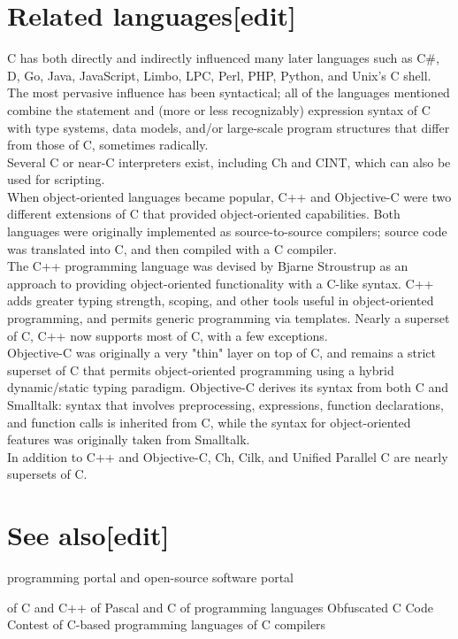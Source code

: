 \documentclass{article}\usepackage{titlesec}
\begin{document}
\section{Related languages[edit]}
C has both directly and indirectly influenced many later languages such as C\#, D, Go, Java, JavaScript, Limbo, LPC, Perl, PHP, Python, and Unix's C shell. The most pervasive influence has been syntactical; all of the languages mentioned combine the statement and (more or less recognizably) expression syntax of C with type systems, data models, and/or large-scale program structures that differ from those of C, sometimes radically.
\\
Several C or near-C interpreters exist, including Ch and CINT, which can also be used for scripting.
\\
When object-oriented languages became popular, C++ and Objective-C were two different extensions of C that provided object-oriented capabilities. Both languages were originally implemented as source-to-source compilers; source code was translated into C, and then compiled with a C compiler.
\\
The C++ programming language was devised by Bjarne Stroustrup as an approach to providing object-oriented functionality with a C-like syntax. C++ adds greater typing strength, scoping, and other tools useful in object-oriented programming, and permits generic programming via templates. Nearly a superset of C, C++ now supports most of C, with a few exceptions.
\\
Objective-C was originally a very "thin" layer on top of C, and remains a strict superset of C that permits object-oriented programming using a hybrid dynamic/static typing paradigm. Objective-C derives its syntax from both C and Smalltalk: syntax that involves preprocessing, expressions, function declarations, and function calls is inherited from C, while the syntax for object-oriented features was originally taken from Smalltalk.
\\
In addition to C++ and Objective-C, Ch, Cilk, and Unified Parallel C are nearly supersets of C.
\\

\section{See also[edit]}

\begin{itemize}
\itemComputer programming portal
\itemFree and open-source software portal\end{itemize}
\begin{itemize}\itemCompatibility of C and C++
\itemComparison of Pascal and C
\itemComparison of programming languages
\itemInternational Obfuscated C Code Contest
\itemList of C-based programming languages
\itemList of C compilers\end{itemize}
\end{document}
